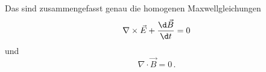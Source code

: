 Das sind zusammengefasst genau die homogenen Maxwellgleichungen
\[
\nabla \times \vec{E} + \frac{\d \vec{B}}{\d t} = 0
\]
und
\[
\nabla \cdot \vec{B} = 0 \, .
\]
